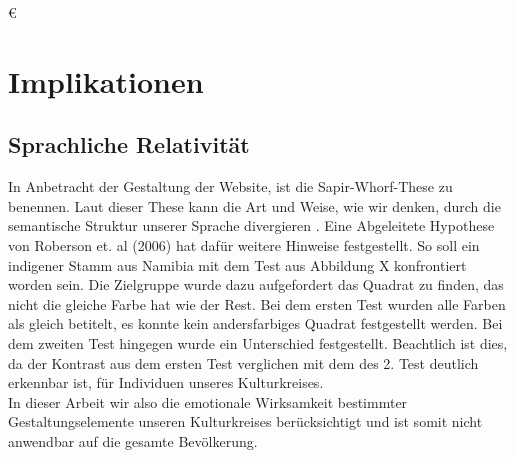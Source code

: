 €\documentclass[./dokumentation.tex]{subfiles}
\begin{document}
\section{Implikationen}
\subsection{Sprachliche Relativität}
In Anbetracht der Gestaltung der Website, ist die Sapir-Whorf-These zu benennen. Laut dieser These kann die Art und Weise, wie wir denken, durch die semantische Struktur unserer Sprache divergieren \cite{Cibelli2016}. Eine Abgeleitete Hypothese von Roberson et. al (2006) hat dafür weitere Hinweise festgestellt. So soll ein indigener Stamm aus Namibia mit dem Test aus Abbildung X konfrontiert worden sein. Die Zielgruppe wurde dazu aufgefordert das Quadrat zu finden, das nicht die gleiche Farbe hat wie der Rest. Bei dem ersten Test wurden alle Farben als gleich betitelt, es konnte kein andersfarbiges Quadrat festgestellt werden. Bei dem zweiten Test hingegen wurde ein Unterschied festgestellt. Beachtlich ist dies, da der Kontrast aus dem ersten Test verglichen mit dem des 2. Test deutlich erkennbar  ist, für Individuen unseres Kulturkreises.\\
In dieser Arbeit wir also die emotionale Wirksamkeit bestimmter Gestaltungselemente unseren Kulturkreises berücksichtigt und ist somit nicht anwendbar auf die gesamte Bevölkerung. 
\end{document}
